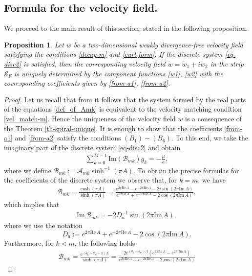 \documentclass[11pt, letterpaper, reqno]{amsart}
\numberwithin{equation}{section}
\theoremstyle{definition}
\theoremstyle{plain}
\newtheorem{prop}[defi]{Proposition}
\numberwithin{equation}{section}
\def\SS{\mathcal{S}}
\begin{document}
\subsection{Formula for the velocity field.} We proceed to the main result of this section, stated in the following proposition.
\begin{prop}\label{prop-form}
Let $w$ be a two-dimensional weakly divergence-free velocity field satisfying the conditions \eqref{decay-m} and \eqref{curl-form}. If the discrete system \eqref{eq-disc2} is satisfied, then the corresponding velocity field $\tilde{w}=\tilde{w}_1+i\tilde{w}_2$ in the strip $\SS_{F}$ is uniquely determined by the component functions \eqref{w1}, \eqref{w2} with the corresponding coefficients given by \eqref{from-a1}, \eqref{from-a2}.
\end{prop}
\begin{proof}
Let us recall that from \cite[Theorem 1.3]{CKO} it follows that the system formed by the real parts of the equations \eqref{def_of_Amk} is equivalent to the velocity matching condition \eqref{vel_match-m}. Hence the uniqueness of the velocity field $w$ is a consequence of the Theorem \ref{th-spiral-unique}. It is enough to show that the coefficients \eqref{from-a1} and \eqref{from-a2} satisfy the conditions $(B_{1})-(B_{6})$. To this end, we take the imaginary part of the discrete system \eqref{eq-disc2} and obtain 
\begin{align}\label{eq-disc2-imag}
\sum_{k=0}^{M-1} \mathrm{Im}(\mathcal{B}_{mk})g_{k} = -\frac{\mu}{a},
\end{align}
where we define $\mathcal{B}_{mk}:= \mathcal{A}_{mk} \sinh^{-1}(\pi A)$. To obtain the precise formulas for the coefficients of the discrete system we observe that, for $k=m$, we have  
\begin{align*}
\mathcal{B}_{mk} =\frac{\cosh(\pi A)}{\sinh(\pi A)} = \frac{e^{2\pi\mathrm{Re}\,A} - e^{-2\pi\mathrm{Re}\,A} - 2i\sin(2\pi\mathrm{Im}\,A)}{e^{2\pi\mathrm{Re}\,A} + e^{-2\pi\mathrm{Re}\,A} - 2\cos(2\pi\mathrm{Im}\,A)}, 
\end{align*} 
which implies that 
\begin{align}\label{im-b-1}
\mathrm{Im}\,\mathcal{B}_{mk} = - 2 D_{a}^{-1}\sin(2\pi\mathrm{Im}\,A),
\end{align}
where we use the notation $$D_{a}:= e^{2\pi\mathrm{Re}\,A} + e^{-2\pi\mathrm{Re}\,A} - 2\cos(2\pi\mathrm{Im}\,A).$$
Furthermore, for $k<m$, the following holds  
\begin{align*}
\mathcal{B}_{mk} = \frac{e^{(\theta_{k}-\theta_{m} + \pi) A}}{\sinh(\pi A)}  = \frac{2e^{(\theta_{k}-\theta_{m})A}\left(e^{2\pi\mathrm{Re}\,A}- e^{2\pi i\mathrm{Im}\,A}\right)}{e^{2\pi\mathrm{Re}\,A} + e^{-2\pi\mathrm{Re}\,A} - 2\cos(2\pi\mathrm{Im}\,A)} 

\end{align*}
\end{proof}
\end{document}
